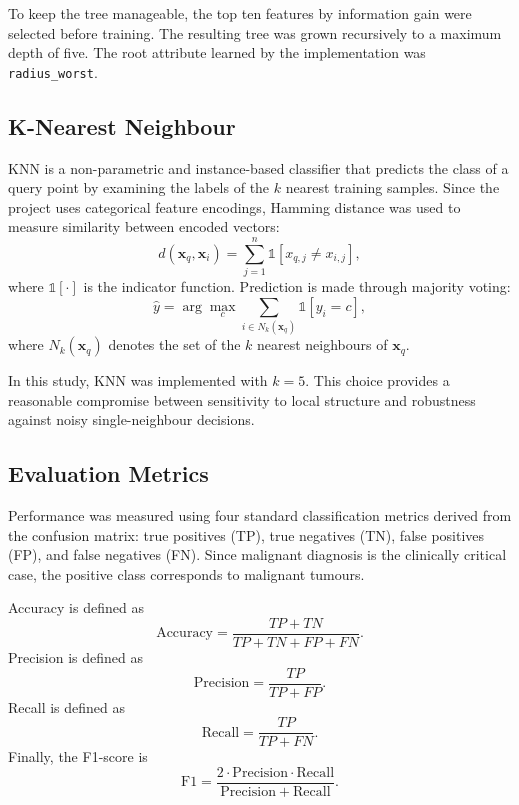 \documentclass[conference]{IEEEtran}
\begin{document}
To keep the tree manageable, the top ten features by information gain were selected before training. The resulting tree was grown recursively to a maximum depth of five. The root attribute learned by the implementation was \texttt{radius\_worst}.

\subsection{K-Nearest Neighbour}
KNN is a non-parametric and instance-based classifier that predicts the class of a query point by examining the labels of the $k$ nearest training samples. Since the project uses categorical feature encodings, Hamming distance was used to measure similarity between encoded vectors:
\begin{equation}
d(\mathbf{x}_q, \mathbf{x}_i) = \sum_{j=1}^{n} \mathbb{1}[x_{q,j} \neq x_{i,j}],
\end{equation}
where $\mathbb{1}[\cdot]$ is the indicator function. Prediction is made through majority voting:
\begin{equation}
\hat{y} = \arg\max_c \sum_{i \in N_k(\mathbf{x}_q)} \mathbb{1}[y_i = c],
\end{equation}
where $N_k(\mathbf{x}_q)$ denotes the set of the $k$ nearest neighbours of $\mathbf{x}_q$.

In this study, KNN was implemented with $k=5$. This choice provides a reasonable compromise between sensitivity to local structure and robustness against noisy single-neighbour decisions.

\subsection{Evaluation Metrics}
Performance was measured using four standard classification metrics derived from the confusion matrix: true positives (TP), true negatives (TN), false positives (FP), and false negatives (FN). Since malignant diagnosis is the clinically critical case, the positive class corresponds to malignant tumours.

Accuracy is defined as
\begin{equation}
\mathrm{Accuracy} = \frac{TP + TN}{TP + TN + FP + FN}.
\end{equation}
Precision is defined as
\begin{equation}
\mathrm{Precision} = \frac{TP}{TP + FP}.
\end{equation}
Recall is defined as
\begin{equation}
\mathrm{Recall} = \frac{TP}{TP + FN}.
\end{equation}
Finally, the F1-score is
\begin{equation}
\mathrm{F1} = \frac{2 \cdot \mathrm{Precision} \cdot \mathrm{Recall}}{\mathrm{Precision} + \mathrm{Recall}}.
\end{equation}
\end{document}
